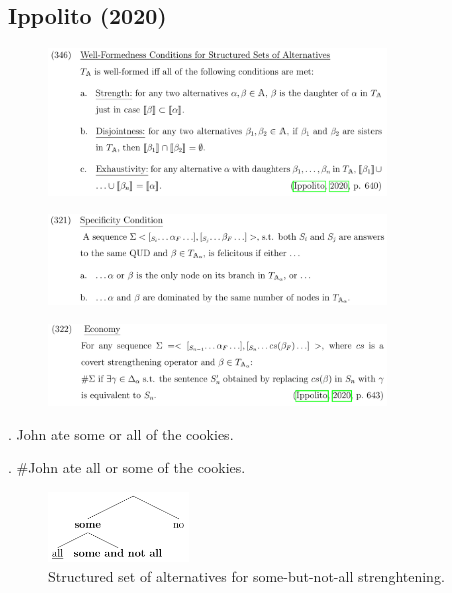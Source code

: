 \subsection*{Ippolito (2020)}
\begin{frame}[t]
\subsectionpage\vskip 9pt\vfill
\begin{figure}
    \centering
    \includegraphics[width=0.8\textwidth]{graphics/ippolito-conditions.png}
\end{figure}\vfill
\end{frame}

\begin{frame}[t]
\subsectionpage\vskip 9pt\vfill
\begin{figure}
    \centering
    \includegraphics[width=0.8\textwidth]{graphics/ippolito-specificity.png}
\end{figure}\vfill
\end{frame}

\begin{frame}[t]
\subsectionpage\vskip 9pt\vfill
\begin{figure}
    \centering
    \includegraphics[width=0.8\textwidth]{graphics/ippolito-economy.png}
\end{figure}\vfill
\end{frame}

\begin{frame}[t]
\subsectionpage\vskip 9pt\vfill
\ex. John ate some or all of the cookies.

\ex. \#John ate all or some of the cookies.

\vfill
\begin{figure}
    \centering
    \includegraphics[width=0.3333\textwidth]{graphics/ippolito-someall-tree.png}
    \caption{Structured set of alternatives for some-but-not-all strenghtening.}
\end{figure}\vfill
\end{frame}

